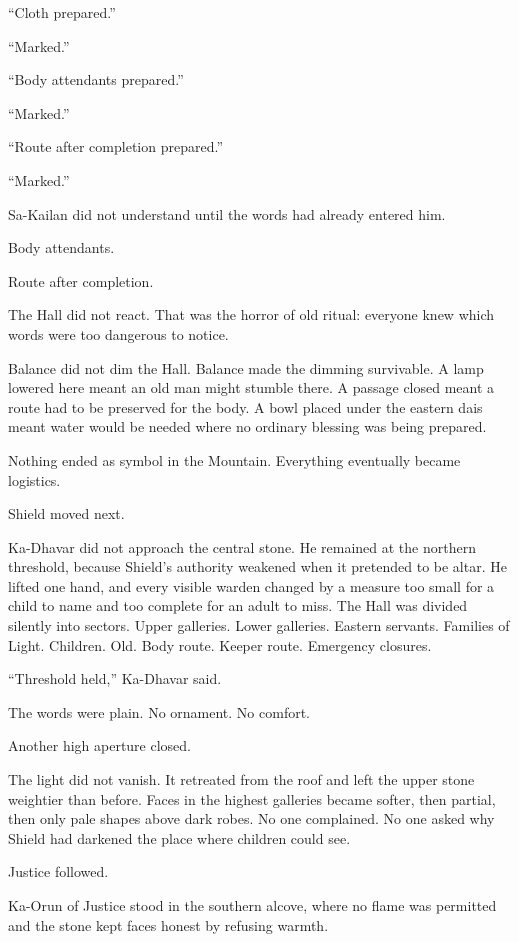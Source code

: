 “Cloth prepared.”\par
“Marked.”\par
“Body attendants prepared.”\par
“Marked.”\par
“Route after completion prepared.”\par
“Marked.”\par
Sa-Kailan did not understand until the words had already entered him.\par
Body attendants.\par
Route after completion.\par
The Hall did not react.
That was the horror of old ritual: everyone knew which words were too dangerous to notice.\par
Balance did not dim the Hall.
Balance made the dimming survivable.
A lamp lowered here meant an old man might stumble there.
A passage closed meant a route had to be preserved for the body.
A bowl placed under the eastern dais meant water would be needed where no ordinary blessing was being prepared.\par
Nothing ended as symbol in the Mountain.
Everything eventually became logistics.\par
Shield moved next.\par
Ka-Dhavar did not approach the central stone.
He remained at the northern threshold, because Shield’s authority weakened when it pretended to be altar.
He lifted one hand, and every visible warden changed by a measure too small for a child to name and too complete for an adult to miss.
The Hall was divided silently into sectors.
Upper galleries.
Lower galleries.
Eastern servants.
Families of Light.
Children.
Old.
Body route.
Keeper route.
Emergency closures.\par
“Threshold held,” Ka-Dhavar said.\par
The words were plain.
No ornament.
No comfort.\par
Another high aperture closed.\par
The light did not vanish.
It retreated from the roof and left the upper stone weightier than before.
Faces in the highest galleries became softer, then partial, then only pale shapes above dark robes.
No one complained.
No one asked why Shield had darkened the place where children could see.\par
Justice followed.\par
Ka-Orun of Justice stood in the southern alcove, where no flame was permitted and the stone kept faces honest by refusing warmth.
